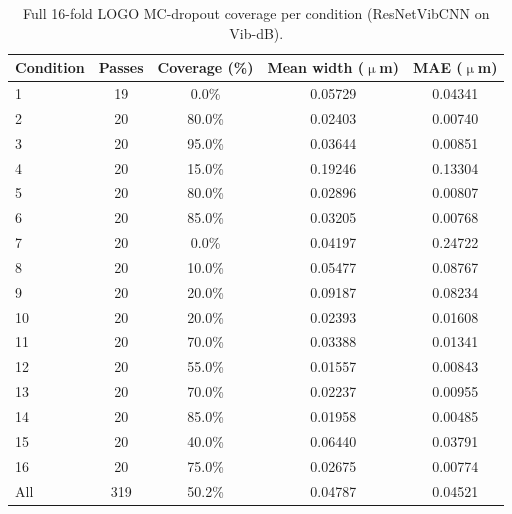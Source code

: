 \begin{table}[htbp]
\centering
\caption{Full 16-fold LOGO MC-dropout coverage per condition
(ResNetVibCNN on Vib-dB).}\label{tab:supp-mcdropout-full-logo}
\begin{tabular}{@{}lcccc@{}}
\toprule
Condition & Passes & Coverage (\%) & Mean width ($\upmu$m) & MAE ($\upmu$m) \\
\midrule
1 & 19 & 0.0\% & 0.05729 & 0.04341 \\
2 & 20 & 80.0\% & 0.02403 & 0.00740 \\
3 & 20 & 95.0\% & 0.03644 & 0.00851 \\
4 & 20 & 15.0\% & 0.19246 & 0.13304 \\
5 & 20 & 80.0\% & 0.02896 & 0.00807 \\
6 & 20 & 85.0\% & 0.03205 & 0.00768 \\
7 & 20 & 0.0\% & 0.04197 & 0.24722 \\
8 & 20 & 10.0\% & 0.05477 & 0.08767 \\
9 & 20 & 20.0\% & 0.09187 & 0.08234 \\
10 & 20 & 20.0\% & 0.02393 & 0.01608 \\
11 & 20 & 70.0\% & 0.03388 & 0.01341 \\
12 & 20 & 55.0\% & 0.01557 & 0.00843 \\
13 & 20 & 70.0\% & 0.02237 & 0.00955 \\
14 & 20 & 85.0\% & 0.01958 & 0.00485 \\
15 & 20 & 40.0\% & 0.06440 & 0.03791 \\
16 & 20 & 75.0\% & 0.02675 & 0.00774 \\
All & 319 & 50.2\% & 0.04787 & 0.04521 \\
\bottomrule
\end{tabular}
\end{table}
